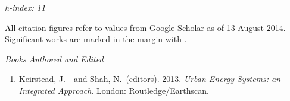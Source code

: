 \documentclass[11pt,a4paper]{article}
\newcommand{\marginhead}[1]{\marginpar{\textsf{{\footnotesize #1}}}}
\newcommand{\flag}{\marginpar{\hfill\raisebox{-2pt}{*}}}
\begin{document}
\begin{flushright}
\itshape h-index: 11
\medskip

All citation figures refer to values from Google Scholar as of 13 August 2014.  Significant works are marked in the margin with \raisebox{-2pt}{*}.
\end{flushright}

\bigskip

\raggedright 
\noindent\marginhead{Books}%
%
\noindent\emph{Books Authored and Edited \vspace{0.01in}}

\begin{enumerate}
\item Keirstead, J.\ \flag\ and Shah, N.\ (editors).  2013. \emph{Urban Energy Systems: an Integrated Approach}. London: Routledge/Earthscan.\label{book:ues}
\end{enumerate}

\bigskip
\end{document}
